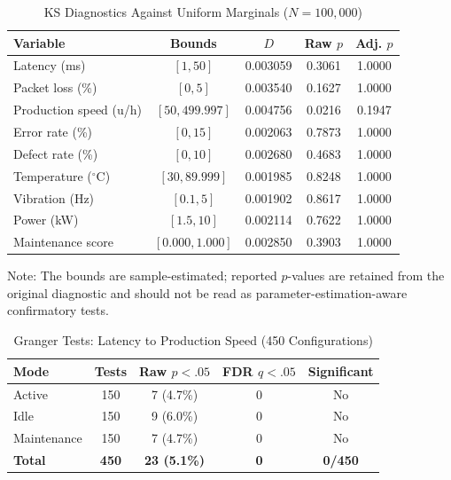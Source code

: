 \documentclass[conference]{IEEEtran}
\begin{document}
\begin{table}[t]
\caption{KS Diagnostics Against Uniform Marginals ($N = 100,000$)}
\label{tab:ks_uniformity}
\centering
\footnotesize
\setlength{\tabcolsep}{3pt}
\begin{tabular}{@{}lcccc@{}}
\toprule
\textbf{Variable} & \textbf{Bounds} & \textbf{$D$} & \textbf{Raw $p$} & \textbf{Adj. $p$} \\
\midrule
Latency (ms) & $[1, 50]$ & 0.003059 & 0.3061 & 1.0000 \\
Packet loss (\%) & $[0, 5]$ & 0.003540 & 0.1627 & 1.0000 \\
Production speed (u/h) & $[50, 499.997]$ & 0.004756 & 0.0216 & 0.1947 \\
Error rate (\%) & $[0, 15]$ & 0.002063 & 0.7873 & 1.0000 \\
Defect rate (\%) & $[0, 10]$ & 0.002680 & 0.4683 & 1.0000 \\
Temperature ($^{\circ}\text{C}$) & $[30, 89.999]$ & 0.001985 & 0.8248 & 1.0000 \\
Vibration (Hz) & $[0.1, 5]$ & 0.001902 & 0.8617 & 1.0000 \\
Power (kW) & $[1.5, 10]$ & 0.002114 & 0.7622 & 1.0000 \\
Maintenance score & $[0.000, 1.000]$ & 0.002850 & 0.3903 & 1.0000 \\
\bottomrule
\end{tabular}
\vspace{0.5ex}
{\raggedright \scriptsize Note: The bounds are sample-estimated; reported $p$-values are retained from the original diagnostic and should not be read as parameter-estimation-aware confirmatory tests.\par}
\end{table}

\begin{table}[t]
\caption{Granger Tests: Latency to Production Speed (450 Configurations)}
\label{tab:granger_summary}
\centering
\footnotesize
\setlength{\tabcolsep}{3.5pt}
\begin{tabular}{@{}lcccc@{}}
\toprule
\textbf{Mode} & \textbf{Tests} & \textbf{Raw $p < .05$} & \textbf{FDR $q < .05$} & \textbf{Significant} \\
\midrule
Active & 150 & 7 (4.7\%) & 0 & No \\
Idle & 150 & 9 (6.0\%) & 0 & No \\
Maintenance & 150 & 7 (4.7\%) & 0 & No \\
\midrule
\textbf{Total} & \textbf{450} & \textbf{23 (5.1\%)} & \textbf{0} & \textbf{0/450} \\
\bottomrule
\end{tabular}
\end{table}
\end{document}
